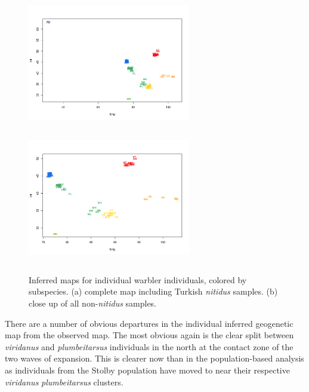 \documentclass[12pt]{article}
\begin{document}

\begin{figure}
	\centering
			{\includegraphics[width=2.8in,height=2.3in]{figs/individual_warbler_map_noarrows_randpr1.png}}
			{\includegraphics[width=2.8in,height=2.3in]{figs/individual_warbler_map_noarrows_closeup_randpr1.png}}
	\caption{Inferred maps for individual warbler individuals, colored by subspecies. (a) complete map including Turkish \textit{nitidus} samples.  (b) close up of all non-\textit{nitidus} samples.}\label{sfig:warbler_inds}
\end{figure}

There are a number of obvious departures in the individual inferred geogenetic map from the observed map. The most obvious again is the clear split between \textit{viridanus} and \textit{plumbeitarsus} individuals in the north at the contact zone of the two waves of expansion.  This is clearer now than in the population-based analysis as individuals from the Stolby population have moved to near their respective \textit{viridanus} \textit{plumbeitarsus}  clusters. 
\end{document}

